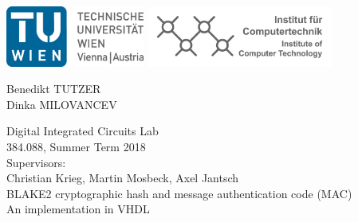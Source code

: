 \documentclass[%
	a4paper,
]
{article}
\begin{document}
%
\begin{titlepage}

	\begin{center}

	\includegraphics[height=2cm]{fig/logo-tu.png}%
	\hfill{}%
	\includegraphics[height=2cm]{fig/logo-ict.png}%
	

	\vspace{5em}


		\large
		Benedikt TUTZER\\
		Dinka MILOVANCEV\\
	

	\vspace{5em}

		{\huge Digital Integrated Circuits Lab}\\[1em]
		{\Large 384.088, Summer Term 2018} \\[2em]
		{\large Supervisors:\\[.5em]
			Christian Krieg, Martin Mosbeck, Axel Jantsch} \\[10em]

		{\Huge BLAKE2 cryptographic hash and message authentication code (MAC)}\\[2em]
		{\Large An implementation in VHDL}
		\\[8em]
	\end{center}


\begin{abstract}

		The task of our group was to implement \emph{BLAKE2b} hash function as
specified in \autocite{rfc7693}. The \emph{BLAKE2b} algorithm computation was
implemented using state machines, the implementation was syntactically correct
and synthesizable. The functional correctness was verified by using the
reference implementation given in C. The test bench compared the output of our
entity with the reference hash value for the same message input and reported
the result in terminal. For the message input we used the random data
generated by the Task 1 implementation. The \emph{BLAKE2b} hash function
entity is to be used as a component of \emph{Argon2} memory hard function
which should generate cryptographically secure keys from passwords as
specified in \autocite{irtf-cfrg-argon2-03}. The \emph{Argon2} function should
be implemented targeting \emph{Nexyx 4 DDR} board.
\end{abstract}
\end{titlepage}
%
%
%
%
\end{document}

